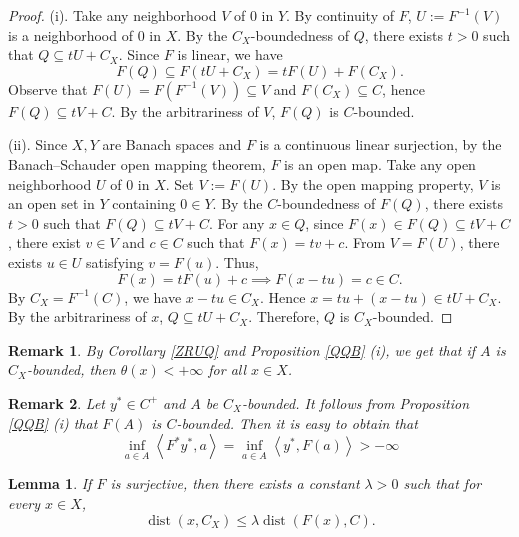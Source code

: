 \documentclass[11pt]{article}
\newtheorem{lemma}{Lemma}[section]
\newtheorem{remark}{Remark}[section]
\begin{document}
\begin{proof}
	(i). Take any neighborhood $V$ of $0$ in $Y$. By continuity of $F$, $U := F^{-1}(V)$ is a neighborhood of $0$ in $X$. By the $C_X$-boundedness of $Q$, there exists $t > 0$ such that $Q \subseteq tU + C_X$. Since $F$ is linear,  we have 
	\[
	F(Q) \subseteq F(tU + C_X) = tF(U) + F(C_X).
	\]
	Observe that $F(U) = F(F^{-1}(V)) \subseteq V$ and $F(C_X) \subseteq C$, hence $F(Q) \subseteq tV + C$.
	By the arbitrariness of $V$, $F(Q)$ is $C$-bounded.
	
	(ii). Since $X, Y$ are Banach spaces and $F$ is a continuous linear surjection, by the Banach--Schauder open mapping theorem, $F$ is an open map. Take any open neighborhood $U$ of $0$ in $X$. Set $V := F(U)$. By the open mapping property, $V$ is an open set in $Y$ containing $0 \in Y$. By the $C$-boundedness of $F(Q)$, there exists $t > 0$ such that $F(Q) \subseteq tV + C$. For any $x \in Q$, since $F(x) \in F(Q) \subseteq tV + C$, there exist $v \in V$ and $c \in C$ such that $F(x) = t v + c$. From $V = F(U)$, there exists $u \in U$ satisfying $v = F(u)$. Thus,
	\[
	F(x) = t F(u) + c \implies F(x - t u) = c \in C.
	\]
	By $C_X = F^{-1}(C)$, we have $x - t u \in C_X$. Hence $x = t u + (x - t u) \in tU + C_X$.
	By the arbitrariness of $x$, $Q \subseteq tU + C_X$. Therefore, $Q$ is $C_X$-bounded.
\end{proof}


\begin{remark}  By   Corollary  \ref{ZRUQ}  and Proposition  \ref{QQB}  (i), we get that  if $A$ is $C_X$-bounded, then $\theta(x)<+\infty$ for all $x\in X$.
   \end{remark}


\begin{remark}   \label{VKYJQ}  Let $y^* \in  C^+$ and  $A$ be $C_X$-bounded.  It follows from  Proposition  \ref{QQB}  (i)  that $F(A)$ is $C$-bounded. Then it is easy to obtain that 
	$$\mathop {\inf }\limits_{a \in A} \left\langle {{F^*}{y^*},a} \right\rangle  = \mathop {\inf }\limits_{a \in A} \left\langle {{y^*},F\left( a \right)} \right\rangle  >  - \infty $$
	
  \end{remark}


\begin{lemma}\label{XDRT}
	If $F$ is surjective, then there exists a constant $\lambda>0$ such that for every $x\in X$,
	\[
	\operatorname{dist}(x, C_X) \le \lambda \operatorname{dist}(F(x), C).
	\]
\end{lemma}
\end{document}
